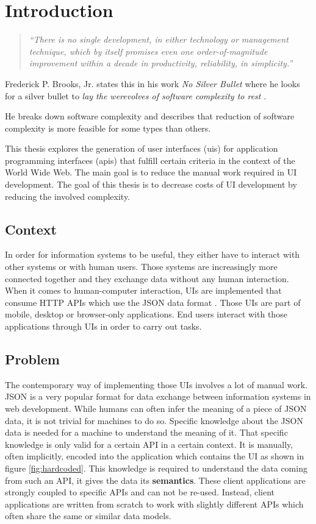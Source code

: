 \section{Introduction}\label{introduction}

\begin{quotation}
\textit{``There is no single development, in either technology or management technique, which by itself promises even one order-of-magnitude improvement within a decade in productivity, reliability, in simplicity.''} \citep[p.~1]{nosilverbullet}
\end{quotation}

Frederick P. Brooks, Jr. states this in his work \textit{No Silver Bullet} where he looks for a silver bullet to \textit{lay the werevolves of software complexity to rest} \citep[p.~1]{nosilverbullet}.

He breaks down software complexity and describes that reduction of software complexity is more feasible for some types than others.

This thesis explores the generation of user interfaces (\gls{ui}s) for application programming interfaces (\gls{api}s) that fulfill certain criteria in the context of the World Wide Web. The main goal is to reduce the manual work required in UI development. The goal of this thesis is to decrease costs of UI development by reducing the involved complexity.

\subsection{Context}\label{context}
In order for information systems to be useful, they either have to interact with other systems or with human users. Those systems are increasingly more connected together and they exchange data without any human interaction. When it comes to human-computer interaction, UIs are implemented that consume HTTP APIs which use the JSON data format \citep{jsonformat}. Those UIs are part of mobile, desktop or browser-only applications. End users interact with those applications through UIs in order to carry out tasks.

\subsection{Problem}\label{problem}
The contemporary way of implementing those UIs involves a lot of manual work. JSON is a very popular format for data exchange between information systems in web development. While humans can often infer the meaning of a piece of JSON data, it is not trivial for machines to do so. Specific knowledge about the JSON data is needed for a machine to understand the meaning of it. That specific knowledge is only valid for a certain API in a certain context. It is manually, often implicitly, encoded into the application which contains the UI as shown in figure \ref{fig:hardcoded}. This knowledge is required to understand the data coming from such an API, it gives the data its \textbf{semantics}. These client applications are strongly coupled to specific APIs and can not be re-used. Instead, client applications are written from scratch to work with slightly different APIs which often share the same or similar data models.

